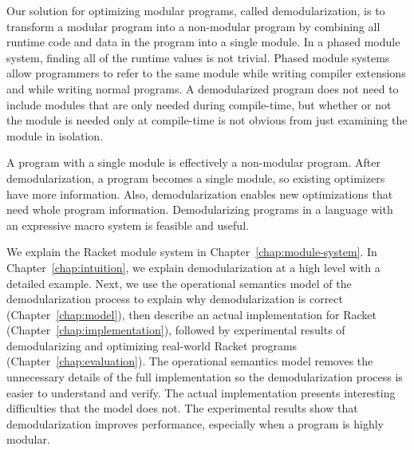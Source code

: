 Our solution for optimizing modular programs, called demodularization, is to transform a modular program into a non-modular program by combining all runtime code and data in the program into a single module.
In a phased module system, finding all of the runtime values is not trivial.
Phased module systems allow programmers to refer to the same module while writing compiler extensions and while writing normal programs.
A demodularized program does not need to include modules that are only needed during compile-time, but whether or not the module is needed only at compile-time is not obvious from just examining the module in isolation. 

A program with a single module is effectively a non-modular program. 
After demodularization, a program becomes a single module, so existing optimizers have more information. 
Also, demodularization enables new optimizations that need whole program information. 
Demodularizing programs in a language with an expressive macro system is feasible and useful.

We explain the Racket module system in Chapter~\ref{chap:module-system}. In Chapter~\ref{chap:intuition}, we explain demodularization at a high level with a detailed example.
Next, we use the operational semantics model of the demodularization process to explain why demodularization is correct (Chapter~\ref{chap:model}), then describe an actual implementation for Racket (Chapter~\ref{chap:implementation}), followed by experimental results of demodularizing and optimizing real-world Racket programs (Chapter~\ref{chap:evaluation}). 
The operational semantics model removes the unnecessary details of the full implementation so the demodularization process is easier to understand and verify. 
The actual implementation presents interesting difficulties that the model does not.
The experimental results show that demodularization improves performance, especially when a program is highly modular. 
